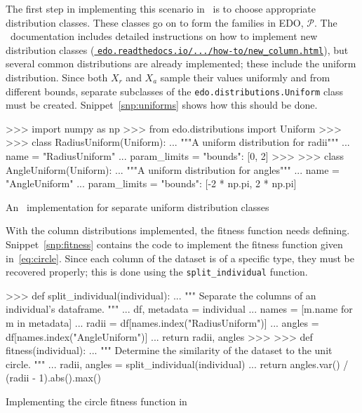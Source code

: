 The first step in implementing this scenario in \edo\ is to choose appropriate
distribution classes. These classes go on to form the families in EDO,
\(\mathcal P\). The \edo\ documentation includes detailed instructions on how to
implement new distribution classes
(\href{https://edo.readthedocs.io/en/latest/how-to/new_column.html}{%
\nolinkurl{edo.readthedocs.io/.../how-to/new\_column.html}}), but several
common distributions are already implemented; these include the uniform
distribution. Since both \(X_r\) and \(X_a\) sample their values uniformly and
from different bounds, separate subclasses of the
\texttt{edo.distributions.Uniform} class must be created.
Snippet~\ref{snp:uniforms} shows how this should be done.

\begin{listing}[htbp]
\begin{usagepy}
>>> import numpy as np
>>> from edo.distributions import Uniform
>>> 
>>> class RadiusUniform(Uniform):
...     """A uniform distribution for radii"""
...     name = "RadiusUniform"
...     param_limits = {"bounds": [0, 2]}
>>> 
>>> class AngleUniform(Uniform):
...     """A uniform distribution for angles"""
...     name = "AngleUniform"
...     param_limits = {"bounds": [-2 * np.pi, 2 * np.pi]}

\end{usagepy}
\caption{An \edo\ implementation for separate uniform distribution classes}
\label{snp:uniforms}
\end{listing}

With the column distributions implemented, the fitness function needs defining.
Snippet~\ref{snp:fitness} contains the code to implement the fitness function
given in~\eqref{eq:circle}. Since each column of the dataset is of a specific
type, they must be recovered properly; this is done using the
\texttt{split_individual} function.

\begin{listing}[htbp]
\begin{usagepy}
>>> def split_individual(individual):
...     """ Separate the columns of an individual's dataframe. """
...     df, metadata = individual
...     names = [m.name for m in metadata]
...     radii = df[names.index("RadiusUniform")]
...     angles = df[names.index("AngleUniform")]
...     return radii, angles
>>> 
>>> def fitness(individual):
...     """ Determine the similarity of the dataset to the unit circle. """
...     radii, angles = split_individual(individual)
...     return angles.var() / (radii - 1).abs().max()

\end{usagepy}
\caption{Implementing the circle fitness function in \edo}
\label{snp:fitness}
\end{listing}

